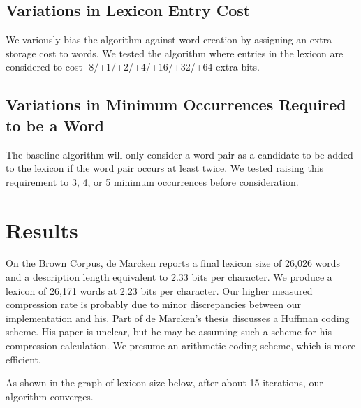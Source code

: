 \documentclass[11pt, oneside, fleqn]{article}
\begin{document}
	\subsection{Variations in Lexicon Entry Cost}

	We variously bias the algorithm against word creation by assigning an extra storage cost to words. We tested the algorithm where entries in the lexicon are considered to cost -8/+1/+2/+4/+16/+32/+64 extra bits.

	\subsection{Variations in Minimum Occurrences Required to be a Word}

	The baseline algorithm will only consider a word pair as a candidate to be added to the lexicon if the word pair occurs at least twice. We tested raising this requirement to 3, 4, or 5 minimum occurrences before consideration.

 \pagebreak

   \section{Results}

   On the Brown Corpus, de Marcken reports a final lexicon size of 26,026 words and a description length equivalent to 2.33 bits per character. We produce a lexicon of 26,171 words at 2.23 bits per character. Our higher measured compression rate is probably due to minor discrepancies between our implementation and his. Part of de Marcken's thesis discusses a Huffman coding scheme. His paper is unclear, but he may be assuming such a scheme for his compression calculation. We presume an arithmetic coding scheme, which is more efficient.

   As shown in the graph of lexicon size below, after about 15 iterations, our algorithm converges.
\end{document}
